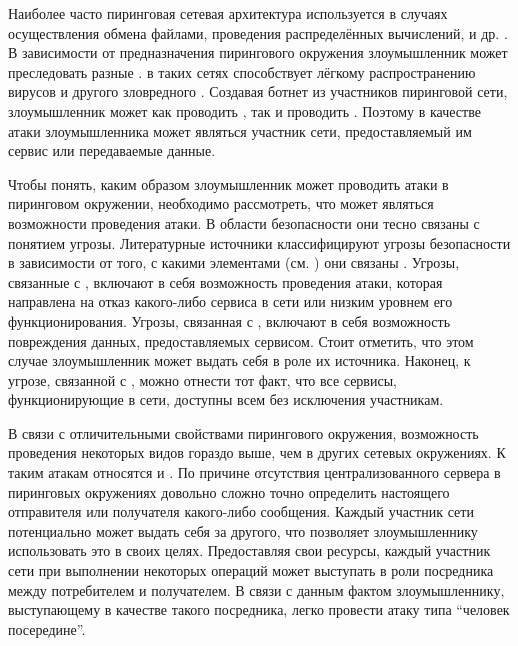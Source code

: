 %
Наиболее часто пиринговая сетевая архитектура используется в случаях осуществления обмена файлами, проведения распределённых вычислений,  и др. .
%
%
В зависимости от предназначения пирингового окружения злоумышленник может преследовать разные   . 
%
 в таких сетях способствует лёгкому распространению вирусов и другого зловредного . 
%
Создавая ботнет из участников пиринговой сети, злоумышленник может как проводить , так и проводить . 
%
Поэтому в качестве  атаки злоумышленника может являться участник сети, предоставляемый им сервис или передаваемые данные. 

%
Чтобы понять, каким образом злоумышленник может проводить атаки в пиринговом окружении, необходимо рассмотреть, что может являться  возможности проведения атаки.
%
В области безопасности они тесно связаны с понятием угрозы.
%
Литературные источники классифицируют угрозы безопасности в зависимости от того, с какими элементами  (см. ) они связаны   . 
%
Угрозы, связанные с , включают в себя возможность проведения атаки, которая направлена на отказ какого-либо сервиса в сети или низким уровнем его функционирования. 
%
Угрозы, связанная с , включают в себя возможность повреждения данных, предоставляемых сервисом. 
%
Стоит отметить, что этом случае злоумышленник может выдать себя в роле их источника. 
%
Наконец, к угрозе, связанной с , можно отнести тот факт, что все сервисы, функционирующие в сети, доступны всем без исключения участникам.

%
В связи с отличительными свойствами пирингового окружения, возможность проведения некоторых видов  гораздо выше, чем в других сетевых окружениях. 
%
К таким атакам относятся  и  . 
%
По причине отсутствия централизованного сервера в пиринговых окружениях довольно сложно точно определить настоящего отправителя или получателя какого-либо сообщения.
%
Каждый участник сети потенциально может выдать себя за другого, что позволяет злоумышленнику использовать это в своих целях.  
%
Предоставляя свои ресурсы, каждый участник сети при выполнении некоторых операций может выступать в роли посредника между потребителем и получателем.
%
В связи с данным фактом злоумышленнику, выступающему в качестве такого посредника, легко провести атаку типа ``человек посередине''. 


